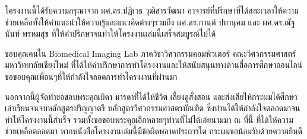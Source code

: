\iffalse
\begin{dedication}
This document is dedicated to all Chiang Mai University students.

Dedication page is optional.
\end{dedication}
\fi %

\begin{acknowledgments}

    \enskip \enskip \enskip โครงงานนี้ได้รับความกรุณาจาก ผศ.ดร.ปฏิเวธ วุฒิสารวัฒนา อาจารย์ที่ปรึกษาที่ได้สละเวลาให้ความช่วยเหลือทั้งให้คำแนะนำให้ความรู้และแนวคิดต่างๆรวมถึง 
    ผศ.ดร.กานต์ ปทานุคม และ ผศ.ดร.ณัฐนันท์ พรหมสุข ที่ให้คำปรึกษาจนทำให้โครงงานเล่มนี้เสร็จสมบูรณ์ไปได้


    ขอบคุณคนใน Biomedical Imaging Lab ภาควิชาวิศวกรรมคอมพิวเตอร์ คณะวิศวกรรมศาสตร์ 
    มหาวิทยาลัยเชียงใหม่ ที่ได้ให้คำปรึกษาการทำโครงงานและให้สนับสนุนทางด้านสื่อการศึกษาออนไลน์ขอขอบคุณเพื่อนๆที่ให้กำลังใจลอดการทำโครงงานที่ผ่านมา
    
    
    นอกจากนี้ผู้จัดทำขอขอบพระคุณบิดา มารดาที่ได้ให้ชีวิต เลี้ยงดูสั่งสอน และส่งเสียให้กระผมได้ศึกษาเล่าเรียนจนจบหลักสูตรปริญญาตรี
    หลักสูตรวิศวกรรมศาสตรบัณฑิต ซึ่งท่านได้ให้กำลังใจตลอดมาจนทำให้โครงงานนี้สำเร็จ 
    รวมทั้งขอขอบพระคุณอีกหลายๆท่านที่ไม่ได้เอ่ยนามมา ณ ที่นี้ ที่ได้ให้ความช่วยเหลือตลอดมา 
    หากหนังสือโครงงานเล่มนี้มีข้อผิดพลาดประการใด กระผมขอน้อมรับด้วยความยินดี
\end{acknowledgments}%
\fi %

\contentspage

\ifproject
\figurelistpage

\tablelistpage
\fi %



